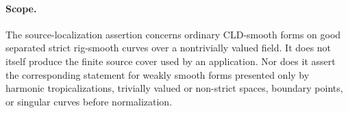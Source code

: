 \paragraph{Scope.}
The source-localization assertion concerns ordinary CLD-smooth forms on good
separated strict rig-smooth curves over a nontrivially valued field.  It does
not itself produce the finite source cover used by an application.  Nor does
it assert the corresponding statement for weakly smooth forms presented only
by harmonic tropicalizations, trivially valued or non-strict spaces, boundary
points, or singular curves before normalization.
